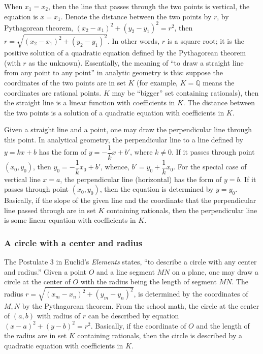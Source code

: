 \documentclass[b5paper]{article}
\begin{document}
When $x_1 = x_2$, then the line that passes through the two points is vertical, the equation is $x = x_1$. Denote the distance between the two points by $r$, by Pythagorean theorem, $(x_2 - x_1)^2 + (y_2 - y_1)^2 = r^2$, then $r = \sqrt{(x_2 - x_1)^2 + (y_2 - y_1)^2}$. In other words, $r$ is a square root; it is the positive solution of a quadratic equation defined by the Pythagorean theorem (with $r$ as the unknown). Essentially, the meaning of \enquote{to draw a straight line from any point to any point} in analytic geometry is this: suppose the coordinates of the two points are in set $K$ (for example, $K = \mathbb{Q}$ means the coordinates are rational points. $K$ may be \enquote{bigger} set containing rationals), then the straight line is a linear function with coefficients in $K$. The distance between the two points is a solution of a quadratic equation with coefficients in $K$.

Given a straight line and a point, one may draw the perpendicular line through this point. In analytical geometry, the perpendicular line to a line defined by $y = kx + b$ has the form of $y = -\dfrac{1}{k} x + b'$, where $k \ne 0$. If it passes through point $(x_0, y_0)$, then $y_0 = -\dfrac{1}{k} x_0 + b'$, whence, $b' = y_0 + \dfrac{1}{k}x_0$. For the special case of vertical line $x = a$, the perpendicular line (horizontal) has the form of $y = b$. If it passes through point $(x_0, y_0)$, then the equation is determined by $y = y_0$. Basically, if the slope of the given line and the coordinate that the perpendicular line passed through are in set $K$ containing rationals, then the perpendicular line is some linear equation with coefficients in $K$.

\subsubsection{A circle with a center and radius}

The Postulate 3 in Euclid's \emph{Elements} states, \enquote{to describe a circle with any center and radius.} Given a point $O$ and a line segment $MN$ on a plane, one may draw a circle at the center of $O$ with the radius being the length of segment $MN$. The radius $r = \sqrt{(x_m - x_n)^2 + (y_m - y_n)^2}$, is determined by the coordinates of $M, N$ by the Pythagorean theorem. From the school math, the circle at the center of $(a, b)$ with radius of $r$ can be described by equation $(x - a)^2 + (y - b)^2 = r^2$. Basically, if the coordinate of $O$ and the length of the radius are in set $K$ containing rationals, then the circle is described by a quadratic equation with coefficients in $K$.
\end{document}
